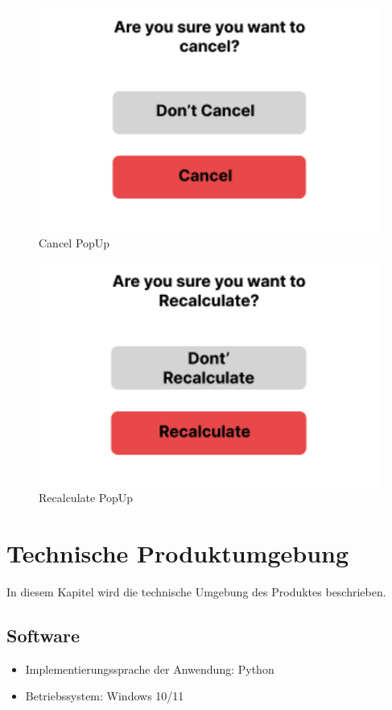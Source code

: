 \documentclass[parskip=full]{scrartcl} %
\begin{document}
\begin{figure}
    \centering
    \includegraphics[width=1\textwidth]{pictures/Cancel PopUp.png}
    \caption{Cancel PopUp}
\end{figure}

\begin{figure}
    \centering
    \includegraphics[width=1\textwidth]{pictures/Recalculate PopUp.png}
    \caption{Recalculate PopUp}
\end{figure}

\newpage



\section{Technische Produktumgebung}
In diesem Kapitel wird die technische Umgebung des Produktes beschrieben.

\subsection{Software}
\begin{itemize}
    \item Implementierungssprache der Anwendung: Python
    \item Betriebssystem: Windows 10/11
\end{itemize}
\end{document}
